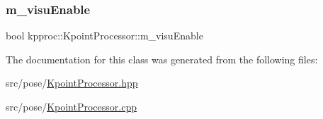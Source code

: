 \subsubsection{\texorpdfstring{m\+\_\+visu\+Enable}{m\_visuEnable}}
{\footnotesize\ttfamily bool kpproc\+::\+Kpoint\+Processor\+::m\+\_\+visu\+Enable\hspace{0.3cm}{\ttfamily [private]}}



The documentation for this class was generated from the following files\+:\begin{DoxyCompactItemize}
\item 
src/pose/\hyperlink{KpointProcessor_8hpp}{Kpoint\+Processor.\+hpp}\item 
src/pose/\hyperlink{KpointProcessor_8cpp}{Kpoint\+Processor.\+cpp}\end{DoxyCompactItemize}
